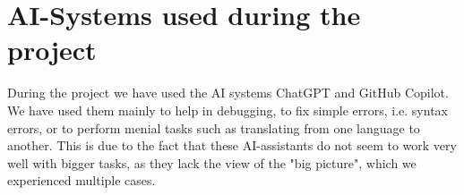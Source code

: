 \section{AI-Systems used during the project}

During the project we have used the AI systems ChatGPT and GitHub Copilot.
We have used them mainly to help in debugging, to fix simple errors, i.e. syntax errors, or to perform menial tasks such as translating from one language to another.
This is due to the fact that these AI-assistants do not seem to work very well with bigger tasks, as they lack the view of the "big picture", which we experienced multiple cases.
%
